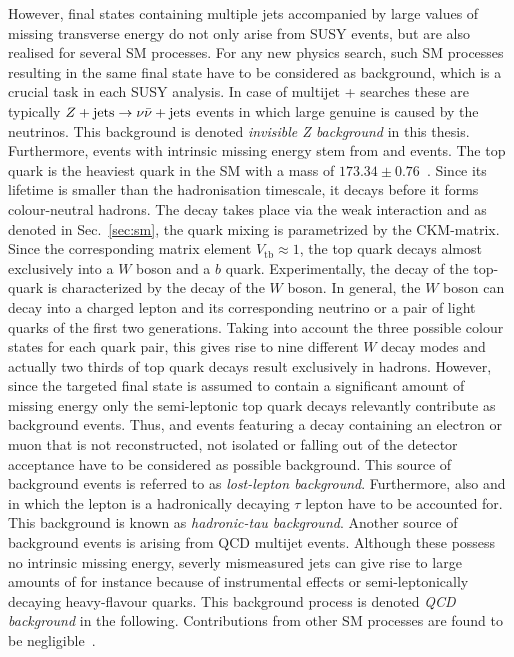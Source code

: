 However, final states containing multiple jets accompanied by large values of missing transverse energy do not only arise from SUSY events, but are also realised for several SM processes. For any new physics search, such SM processes resulting in the same final state have to be considered as background, which is a crucial task in each SUSY analysis. In case of multijet + \met searches these are typically $Z+\text{jets} \rightarrow \nu \bar{\nu} + \mathrm{jets}$ events in which large genuine \met is caused by the neutrinos. This background is denoted \textit{invisible Z background} in this thesis. Furthermore, events with intrinsic missing energy stem from \WJets and \ttbar events. The top quark is the heaviest quark in the SM with a mass of $173.34 \pm 0.76$\gev~\cite{ATLAS:2014wva}. Since its lifetime is smaller than the hadronisation timescale, it decays before it forms colour-neutral hadrons. The decay takes place via the weak interaction and as denoted in Sec.~\ref{sec:sm}, the quark mixing is parametrized by the CKM-matrix. Since the corresponding matrix element $V_{\mathrm{tb}} \approx 1$, the top quark decays almost exclusively into a $W$ boson and a $b$ quark. Experimentally, the decay of the top-quark is characterized by the decay of the $W$ boson. In general, the $W$ boson can decay into a charged lepton and its corresponding neutrino or a pair of light quarks of the first two generations. Taking into account the three possible colour states for each quark pair, this gives rise to nine different $W$ decay modes and actually two thirds of top quark decays result exclusively in hadrons. However, since the targeted final state is assumed to contain a significant amount of missing energy only the semi-leptonic top quark decays relevantly contribute as background events. Thus, \WJets and \ttbar events featuring a decay containing an electron or muon that is not reconstructed, not isolated or falling out of the detector acceptance have to be considered as possible background. This source of background events is referred to as \textit{lost-lepton background}. Furthermore, also \WJets and \ttbar in which the lepton is a hadronically decaying $\tau$ lepton have to be accounted for. This background is known as \textit{hadronic-tau background}. Another source of background events is arising from QCD multijet events. Although these possess no intrinsic missing energy, severly mismeasured jets can give rise to large amounts of \met for instance because of instrumental effects or semi-leptonically decaying heavy-flavour quarks. This background process is denoted \textit{QCD background} in the following. Contributions from other SM processes are found to be negligible~\cite{springerlink:10.1007/JHEP08(2011)155, Chatrchyan:2012lia}. \\

